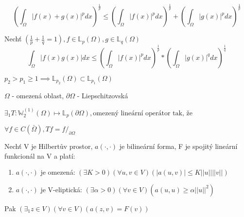 \documentclass[../main.tex]{subfiles}
\begin{document}
\begin{theorem}
    \begin{equation}\label{eq:Mink}
        \left ( \int_\Omega |f(x) + g(x)|^p dx \right ) ^{\frac{1}{p}} \leq \left ( \int_\Omega |f(x)|^p dx \right ) ^{\frac{1}{p}} + \left ( \int_\Omega |g(x)|^p dx \right ) ^{\frac{1}{p}}
    \end{equation}
\end{theorem}


\begin{theorem}
    Nechť $\left (  \frac{1}{p} + \frac{1}{q} = 1 \right ), f \in \mathbb{L}_p(\Omega), g \in \mathbb{L}_q(\Omega)$
    \begin{equation}\label{eq:Holder}
        \int_\Omega \left| f(x)g(x) \right| dx \leq \left ( \int_\Omega |f(x)|^p dx \right ) ^{\frac{1}{p}} * \left ( \int_\Omega |g(x)|^q dx \right ) ^{\frac{1}{q}}
    \end{equation}
\end{theorem}



\begin{theorem}
    


    $p_2 > p_1 \geq 1 \implies \mathbb{L}_{p_2}(\Omega) \subset \mathbb{L}_{p_1}(\Omega)$
    \end{theorem}
    



    \begin{theorem}
        $\Omega$ - omezená oblast, $\partial \Omega$ - Liepschitzovská
        
        $\exists_1 T: \mathbb{W}_2^{(1)}(\Omega) \mapsto \mathbb{L}_p (\partial \Omega), \text{omezený lineární operátor tak, že}$
        
        $ \forall f\in C (\bar \Omega), Tf = f /_{\partial \Omega} $
    \end{theorem}
    



    \begin{theorem}
        Nechť V je Hilbertův prostor, $a(\cdot, \cdot)$ je bilineární forma, F je spojitý lineární funkcionál na V a platí:
        \begin{enumerate}
            \item $a(\cdot, \cdot)$ je omezená: $(\exists K>0)(\forall u,v \in V)(|a(u,v)|\leq K ||u|| ||v||)$
            \item $a(\cdot, \cdot)$ je V-eliptická: $(\exists\alpha>0)(\forall v \in V)(a(u,u)\geq \alpha||u||^2)$
        \end{enumerate}
        Pak $(\exists_1z\in V)(\forall v \in V)(a(z,v) = F(v))$
    \end{theorem}
\end{document}
